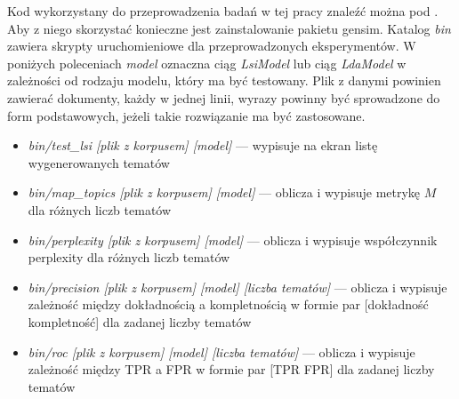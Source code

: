\documentclass[11pt,a4paper]{article}
\begin{document}
Kod wykorzystany do przeprowadzenia badań w tej pracy znaleźć można pod
\cite{code}. Aby z niego skorzystać konieczne jest zainstalowanie pakietu
gensim. Katalog \emph{bin} zawiera skrypty uruchomieniowe dla przeprowadzonych
eksperymentów. W poniżych poleceniach \emph{model} oznaczna ciąg
\emph{LsiModel} lub ciąg \emph{LdaModel} w zależności od rodzaju modelu, który
ma być testowany. Plik z danymi powinien zawierać dokumenty, każdy w jednej
linii, wyrazy powinny być sprowadzone do form podstawowych, jeżeli takie
rozwiązanie ma być zastosowane.

\begin{itemize}
\item \emph{bin/test\_lsi [plik z korpusem] [model]} --- wypisuje na ekran
listę wygenerowanych tematów
\item \emph{bin/map\_topics [plik z korpusem] [model]} --- oblicza i wypisuje
metrykę $M$ dla różnych liczb tematów
\item \emph{bin/perplexity [plik z korpusem] [model]} --- oblicza i wypisuje
współczynnik perplexity dla różnych liczb tematów
\item \emph{bin/precision [plik z korpusem] [model] [liczba tematów]} ---
oblicza i wypisuje zależność między dokładnością a kompletnością w formie
par [dokładność kompletność] dla zadanej liczby tematów
\item \emph{bin/roc [plik z korpusem] [model] [liczba tematów]} ---
oblicza i wypisuje zależność między TPR a FPR w formie
par [TPR FPR] dla zadanej liczby tematów
\end{itemize}

\pagebreak

\listoftables
{}
\listoffigures
{}



\enddocument
\end{document}
